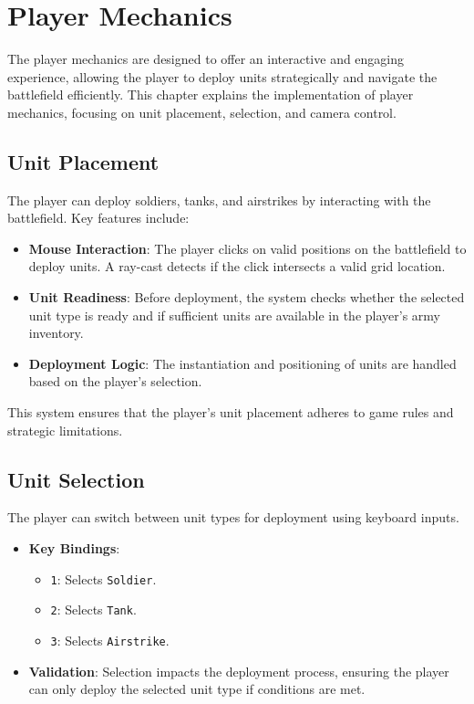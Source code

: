 \chapter{Player Mechanics}

The player mechanics are designed to offer an interactive and engaging experience, allowing the player to deploy units strategically and navigate the battlefield efficiently. This chapter explains the implementation of player mechanics, focusing on unit placement, selection, and camera control.

\section{Unit Placement}
The player can deploy soldiers, tanks, and airstrikes by interacting with the battlefield. Key features include:
\begin{itemize}
    \item \textbf{Mouse Interaction}: The player clicks on valid positions on the battlefield to deploy units. A ray-cast detects if the click intersects a valid grid location.
    \item \textbf{Unit Readiness}: Before deployment, the system checks whether the selected unit type is ready and if sufficient units are available in the player's army inventory.
    \item \textbf{Deployment Logic}: The instantiation and positioning of units are handled based on the player's selection. 
\end{itemize}
This system ensures that the player's unit placement adheres to game rules and strategic limitations.

\section{Unit Selection}
The player can switch between unit types for deployment using keyboard inputs.
\begin{itemize}
    \item \textbf{Key Bindings}:
    \begin{itemize}
        \item \texttt{1}: Selects \texttt{Soldier}.
        \item \texttt{2}: Selects \texttt{Tank}.
        \item \texttt{3}: Selects \texttt{Airstrike}.
    \end{itemize}
    \item \textbf{Validation}: Selection impacts the deployment process, ensuring the player can only deploy the selected unit type if conditions are met.
\end{itemize}

